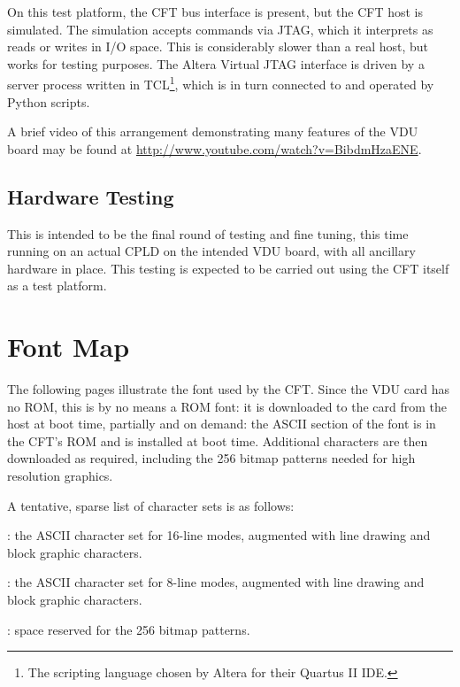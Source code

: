 On this test platform, the CFT bus interface is present, but the CFT host is
simulated. The simulation accepts commands via JTAG, which it interprets as
reads or writes in I/O space. This is considerably slower than a real host, but
works for testing purposes. The Altera Virtual JTAG interface is driven by a
server process written in TCL\footnote{The scripting language chosen by Altera
  for their Quartus II IDE.}, which is in turn connected to and operated by
Python scripts.

A brief video of this arrangement demonstrating many features of the VDU board
may be found at \url{http://www.youtube.com/watch?v=BibdmHzaENE}.

\subsection{Hardware Testing}

This is intended to be the final round of testing and fine tuning, this time
running on an actual CPLD on the intended VDU board, with all ancillary
hardware in place. This testing is expected to be carried out using the CFT
itself as a test platform.



\section{Font Map}

The following pages illustrate the font used by the CFT. Since the VDU card has
no ROM, this is by no means a ROM font: it is downloaded to the card from the
host at boot time, partially and on demand: the ASCII section of the font is in
the CFT's ROM and is installed at boot time. Additional characters are then
downloaded as required, including the 256 bitmap patterns needed for high
resolution graphics.

A tentative, sparse list of character sets is as follows:

\begin{description}

: the ASCII character set for 16-line modes,
augmented with line drawing and block graphic characters.

: the ASCII character set for 8-line modes,
augmented with line drawing and block graphic characters.

: space reserved for the 256 bitmap patterns.
\end{description}

